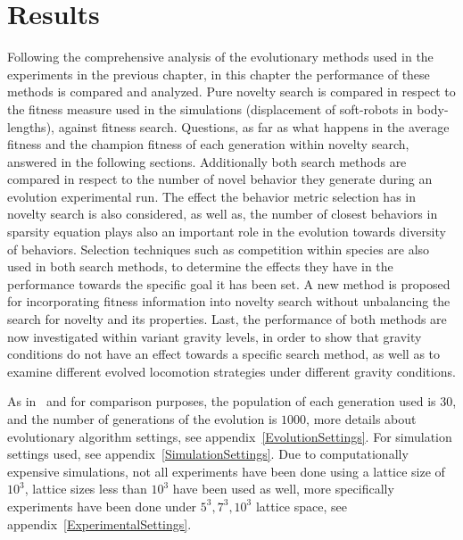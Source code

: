 
\chapter{Results} %

\label{Results} %


Following the comprehensive analysis of the evolutionary methods used in the experiments in the previous chapter, in this chapter the performance of these methods is compared and analyzed. Pure novelty search is compared in respect to the fitness measure used in the simulations (displacement of soft-robots in body-lengths), against fitness search. Questions, as far as what happens in the average fitness and the champion fitness of each generation within novelty search, answered in the following sections. Additionally both search methods are compared in respect to the number of novel behavior they generate during an evolution experimental run. The effect the behavior metric selection has in novelty search is also considered, as well as, the number of closest behaviors in sparsity equation plays also an important role in the evolution towards diversity of behaviors. Selection techniques such as competition within species are also used in both search methods, to determine the effects they have in the performance towards the specific goal it has been set. A new method is proposed for incorporating fitness information into novelty search without unbalancing the search for novelty and its properties. Last, the performance of both methods are now investigated within variant gravity levels, in order to show that gravity conditions do not have an effect towards a specific search method, as well as to examine different evolved locomotion strategies under different gravity conditions.

As in~\citep{cheney2013unshackling} and for comparison purposes, the population of each generation used is $30$, and the number of generations of the evolution is $1000$, more details about evolutionary algorithm settings, see appendix~\ref{EvolutionSettings}. For simulation settings used, see appendix~\ref{SimulationSettings}. Due to computationally expensive simulations, not all experiments have been done using a lattice size of $10^3$, lattice sizes less than $10^3$ have been used as well, more specifically experiments have been done under $5^3, 7^3, 10^3$ lattice space, see appendix~\ref{ExperimentalSettings}.




